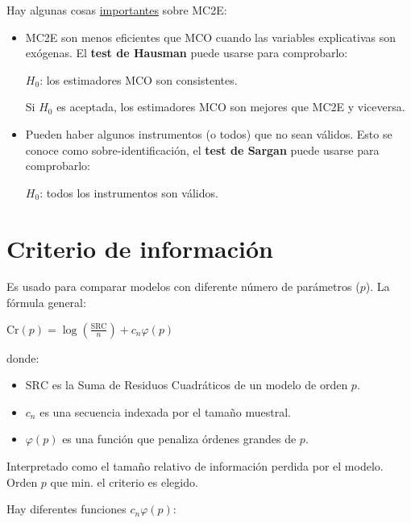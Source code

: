 \documentclass[10pt, a4paper, landscape]{extarticle}
\newcommand{\SSR}{\mathrm{SRC}}
\begin{document}
\begin{multicols}{3}
\begin{itemize}[leftmargin=*]
	Hay algunas cosas \underline{importantes} sobre MC2E:

	\begin{itemize}[leftmargin=*]
		\item MC2E son menos eficientes que MCO cuando las variables explicativas son exógenas. El \textbf{test de Hausman} puede usarse para comprobarlo:
		\begin{center}
			$H_0$: los estimadores MCO son consistentes.
		\end{center}
	
		Si $H_0$ es aceptada, los estimadores MCO son mejores que MC2E y viceversa.
		\item Pueden haber algunos instrumentos (o todos) que no sean válidos. Esto se conoce como sobre-identificación, el \textbf{test de Sargan} puede usarse para comprobarlo:
	
		\begin{center}
			$H_0$: todos los instrumentos son válidos.
		\end{center}
	\end{itemize}
\end{itemize}

\columnbreak

\section*{Criterio de información}

Es usado para comparar modelos con diferente número de parámetros ($p$). La fórmula general:

\begin{center}
	$\mathrm{Cr}(p) = \log(\frac{\SSR}{n}) + c_n \varphi (p)$
\end{center}

donde:

\begin{itemize}[leftmargin=*]
	\item $\SSR$ es la Suma de Residuos Cuadráticos de un modelo de orden $p$.
	\item $c_n$ es una secuencia indexada por el tamaño muestral.
	\item $\varphi(p)$ es una función que penaliza órdenes grandes de $p$.
\end{itemize}

Interpretado como el tamaño relativo de información perdida por el modelo. Orden $p$ que min. el criterio es elegido.

Hay diferentes funciones $c_n \varphi(p)$:


\end{multicols}
\end{document}
